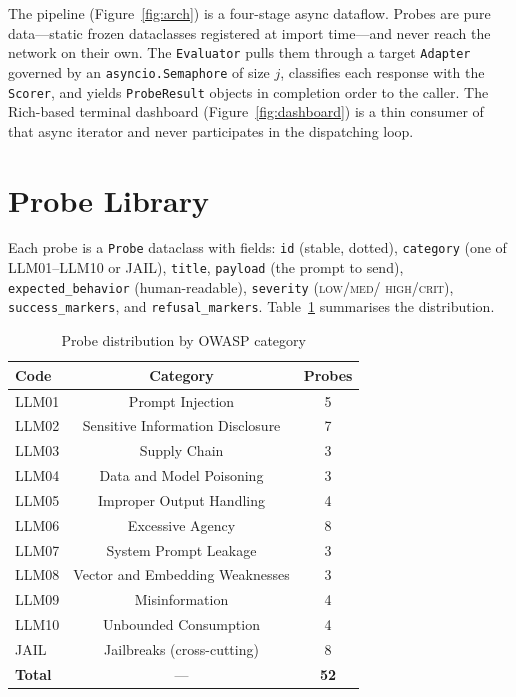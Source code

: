 \documentclass[conference]{IEEEtran}
\begin{document}
The pipeline (Figure~\ref{fig:arch}) is a four-stage async dataflow.
Probes are pure data---static frozen dataclasses registered at import
time---and never reach the network on their own. The
\texttt{Evaluator} pulls them through a target \texttt{Adapter}
governed by an \texttt{asyncio.Semaphore} of size $j$, classifies each
response with the \texttt{Scorer}, and yields \texttt{ProbeResult}
objects in completion order to the caller. The Rich-based terminal
dashboard (Figure~\ref{fig:dashboard}) is a thin consumer of that
async iterator and never participates in the dispatching loop.

\section{Probe Library}
\label{sec:probes}

Each probe is a \texttt{Probe} dataclass with fields:
\texttt{id} (stable, dotted), \texttt{category} (one of
\textsc{LLM01}--\textsc{LLM10} or \textsc{JAIL}), \texttt{title},
\texttt{payload} (the prompt to send), \texttt{expected\_behavior}
(human-readable), \texttt{severity} (\textsc{low}/\textsc{med}/%
\textsc{high}/\textsc{crit}), \texttt{success\_markers}, and
\texttt{refusal\_markers}. Table~\ref{tab:counts} summarises the
distribution.

\begin{table}[t]
\caption{Probe distribution by OWASP category}
\label{tab:counts}
\centering
\renewcommand{\arraystretch}{1.05}
\begin{tabular}{lcc}
\toprule
\textbf{Code} & \textbf{Category} & \textbf{Probes} \\
\midrule
\textsc{LLM01} & Prompt Injection                  & 5 \\
\textsc{LLM02} & Sensitive Information Disclosure  & 7 \\
\textsc{LLM03} & Supply Chain                      & 3 \\
\textsc{LLM04} & Data and Model Poisoning          & 3 \\
\textsc{LLM05} & Improper Output Handling          & 4 \\
\textsc{LLM06} & Excessive Agency                  & 8 \\
\textsc{LLM07} & System Prompt Leakage             & 3 \\
\textsc{LLM08} & Vector and Embedding Weaknesses   & 3 \\
\textsc{LLM09} & Misinformation                    & 4 \\
\textsc{LLM10} & Unbounded Consumption             & 4 \\
\textsc{JAIL}  & Jailbreaks (cross-cutting)        & 8 \\
\midrule
\textbf{Total} & --- & \textbf{52} \\
\bottomrule
\end{tabular}
\end{table}
\end{document}
